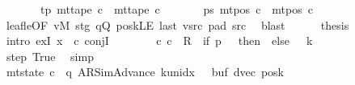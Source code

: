 \begin{isabellebody}
\ \ \ \ \ \ \ tp{\isacharcolon}{\kern0pt}\ {\isachardoublequoteopen}mt{\isacharunderscore}{\kern0pt}tape\ c{\isacharprime}{\kern0pt}{\isacharprime}{\kern0pt}\ {\isacharequal}{\kern0pt}\ mt{\isacharunderscore}{\kern0pt}tape\ c{\isacharprime}{\kern0pt}{\isachardoublequoteclose}\isanewline
\ \ \ \ \ \ \ ps{\isacharcolon}{\kern0pt}\ {\isachardoublequoteopen}mt{\isacharunderscore}{\kern0pt}pos\ c{\isacharprime}{\kern0pt}{\isacharprime}{\kern0pt}\ {\isacharequal}{\kern0pt}\ mt{\isacharunderscore}{\kern0pt}pos\ c{\isacharprime}{\kern0pt}{\isachardoublequoteclose}\isanewline
\ \ \ \ \ \ \isamarkupfalse%
\ leaf{\isacharunderscore}{\kern0pt}le{\isacharbrackleft}{\kern0pt}OF\ vM\ stg\ qQ\ poskLE\ last\ vsrc\ pad{}\ src{}{\isacharbrackright}{\kern0pt}\ \isamarkupfalse%
\ blast\isanewline
\ \ \ \ \isamarkupfalse%
\ {\isacharquery}{\kern0pt}thesis\isanewline
\ \ \ \ \isamarkupfalse%
\ {\isacharparenleft}{\kern0pt}intro\ exI{\isacharbrackleft}{\kern0pt}\ x\ {\isacharequal}{\kern0pt}\ c{\isacharprime}{\kern0pt}{\isacharprime}{\kern0pt}{\isacharbrackright}{\kern0pt}\ conjI{\isacharparenright}{\kern0pt}\isanewline
\ \ \ \ \ \ \isamarkupfalse%
\ {\isachardoublequoteopen}{\isacharparenleft}{\kern0pt}c{\isacharprime}{\kern0pt}{\isacharcomma}{\kern0pt}\ c{\isacharprime}{\kern0pt}{\isacharprime}{\kern0pt}{\isacharparenright}{\kern0pt}\ {\isasymin}\ {\isacharquery}{\kern0pt}R\ {\isacharcircum}{\kern0pt}{\isacharcircum}{\kern0pt}\ {\isacharparenleft}{\kern0pt}if\ p\ {\isacharequal}{\kern0pt}\ {}\ then\ {}\ else\ {}\ {\isacharasterisk}{\kern0pt}\ {\isacharquery}{\kern0pt}k{\isacharparenright}{\kern0pt}{\isachardoublequoteclose}\isanewline
\ \ \ \ \ \ \ \ \isamarkupfalse%
\ step\ True\ \isamarkupfalse%
\ simp\isanewline
\ \ \ \ \ \ \isamarkupfalse%
\ {\isachardoublequoteopen}mt{\isacharunderscore}{\kern0pt}state\ c{\isacharprime}{\kern0pt}{\isacharprime}{\kern0pt}\ {\isacharequal}{\kern0pt}\ {\isacharparenleft}{\kern0pt}q{\isacharcomma}{\kern0pt}\ AR{\isacharunderscore}{\kern0pt}SimAdvance{\isacharcomma}{\kern0pt}\ k{\isacharunderscore}{\kern0pt}unidx\ {}{\isacharcomma}{\kern0pt}\ {}{\isacharcomma}{\kern0pt}\ buf{\isacharcomma}{\kern0pt}\ dvec{\isacharcomma}{\kern0pt}\ posk{\isacharparenright}{\kern0pt}{\isachardoublequoteclose}\isanewline
\ \ \ \ \ \ \ \ \isamarkupfalse%

\end{isabellebody}
